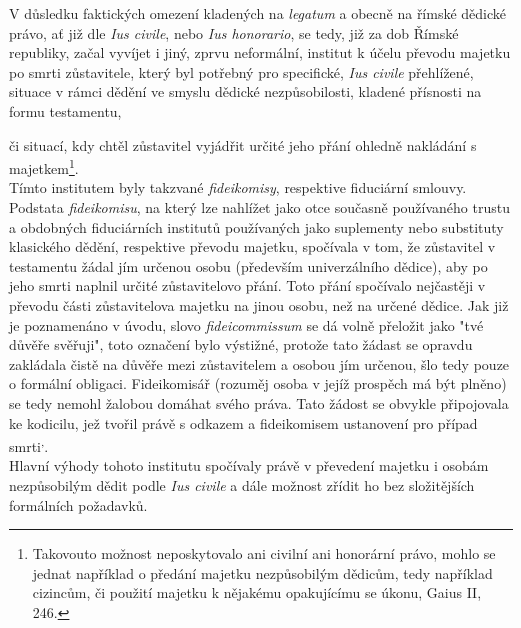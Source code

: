 \documentclass{article}
\begin{document}
V důsledku faktických omezení kladených na \textit{legatum} a obecně na římské dědické právo, ať již dle \textit{Ius civile}, nebo \textit{Ius honorario}, se tedy, již za dob Římské republiky, začal vyvíjet i jiný, zprvu neformální, institut k účelu převodu majetku po smrti zůstavitele, který byl potřebný pro specifické, \textit{Ius civile} přehlížené, situace v rámci dědění ve smyslu dědické nezpůsobilosti, kladené přísnosti na formu testamentu,

\newpage

 či situací, kdy chtěl zůstavitel vyjádřit určité jeho přání ohledně nakládání s majetkem\footnote{Takovouto možnost neposkytovalo ani civilní ani honorární právo, mohlo se jednat například o předání majetku nezpůsobilým dědicům, tedy například cizincům, či použití majetku k nějakému opakujícímu se úkonu, Gaius II, 246.}.\\

 Tímto institutem byly takzvané \textit{fideikomisy}, respektive fiduciární smlouvy. Podstata \textit{fideikomisu}, na který lze nahlížet jako otce současně používaného trustu a obdobných fiduciárních institutů používaných jako suplementy nebo substituty klasického dědění, respektive převodu majetku, spočívala v tom, že zůstavitel v testamentu žádal jím určenou osobu (především univerzálního dědice), aby po jeho smrti naplnil určité zůstavitelovo přání. Toto přání spočívalo nejčastěji v převodu části zůstavitelova majetku na jinou osobu, než na určené dědice. Jak již je poznamenáno v úvodu, slovo \textit{fideicommissum} se dá volně přeložit jako "tvé důvěře svěřuji", toto označení bylo výstižné, protože tato žádast se opravdu zakládala čistě na důvěře mezi zůstavitelem a osobou jím určenou, šlo tedy pouze o formální obligaci. Fideikomisář (rozuměj osoba v jejíž prospěch má být plněno) se tedy nemohl žalobou domáhat svého práva. Tato žádost se obvykle připojovala ke kodicilu, jež tvořil právě s odkazem a fideikomisem ustanovení pro případ smrti\textsuperscript{,}. \\

Hlavní výhody tohoto institutu spočívaly právě v převedení majetku i oso\-bám nezpůsobilým dědit podle \textit{Ius civile} a dále možnost zřídit ho bez složitějších formálních požadavků.\\

\end{document}
